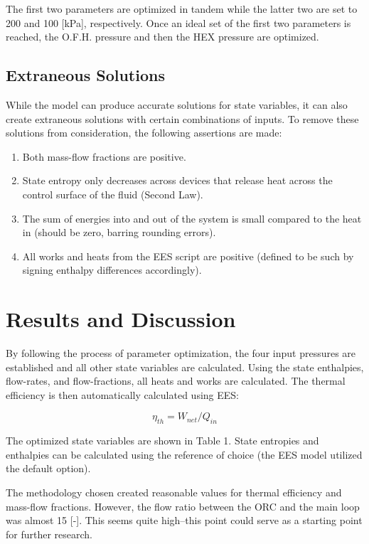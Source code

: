 \documentclass[10pt,cleanfoot]{asme2ej}
\begin{document}
The first two parameters are optimized in tandem while the latter two are set to 200 and 100 [kPa], respectively. Once an ideal set of the first two parameters is reached, the O.F.H. pressure and then the HEX pressure are optimized.

\subsection{Extraneous Solutions}

While the model can produce accurate solutions for state variables, it can also create extraneous solutions with certain combinations of inputs. To remove these solutions from consideration, the following assertions are made:

\begin{enumerate}
\item
Both mass-flow fractions are positive.
\item
State entropy only decreases across devices that release heat across the control surface of the fluid (Second Law).
\item
The sum of energies into and out of the system is small compared to the heat in (should be zero, barring rounding errors).
\item
All works and heats from the EES script are positive (defined to be such by signing enthalpy differences accordingly).
\end{enumerate}

\section{Results and Discussion}

By following the process of parameter optimization, the four input pressures are established and all other state variables are calculated. Using the state enthalpies, flow-rates, and flow-fractions, all heats and works are calculated. The thermal efficiency is then automatically calculated using EES:

\begin{equation}
\eta_{th} = W_{net} / Q_{in}
\label{Thermal Efficiency}
\end{equation}

The optimized state variables are shown in Table 1. State entropies and enthalpies can be calculated using the reference of choice (the EES model utilized the default option).

The methodology chosen created reasonable values for thermal efficiency and mass-flow fractions. However, the flow ratio between the ORC and the main loop was almost 15 [-]. This seems quite high--this point could serve as a starting point for further research.
\end{document}
